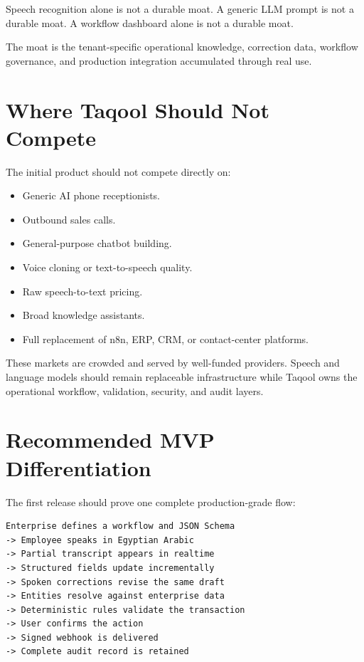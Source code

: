 \documentclass[10.5pt,a4paper]{article}
\newcommand{\BrandName}{Taqool}
\begin{document}
Speech recognition alone is not a durable moat. A generic LLM prompt is
not a durable moat. A workflow dashboard alone is not a durable moat.

The moat is the tenant-specific operational knowledge, correction data,
workflow governance, and production integration accumulated through real use.

\section{Where \BrandName{} Should Not Compete}

The initial product should not compete directly on:

\begin{itemize}
  \item Generic AI phone receptionists.
  \item Outbound sales calls.
  \item General-purpose chatbot building.
  \item Voice cloning or text-to-speech quality.
  \item Raw speech-to-text pricing.
  \item Broad knowledge assistants.
  \item Full replacement of n8n, ERP, CRM, or contact-center platforms.
\end{itemize}

These markets are crowded and served by well-funded providers. Speech and
language models should remain replaceable infrastructure while \BrandName{}
owns the operational workflow, validation, security, and audit layers.

\section{Recommended MVP Differentiation}

The first release should prove one complete production-grade flow:

\begin{lstlisting}
Enterprise defines a workflow and JSON Schema
-> Employee speaks in Egyptian Arabic
-> Partial transcript appears in realtime
-> Structured fields update incrementally
-> Spoken corrections revise the same draft
-> Entities resolve against enterprise data
-> Deterministic rules validate the transaction
-> User confirms the action
-> Signed webhook is delivered
-> Complete audit record is retained
\end{lstlisting}
\end{document}
